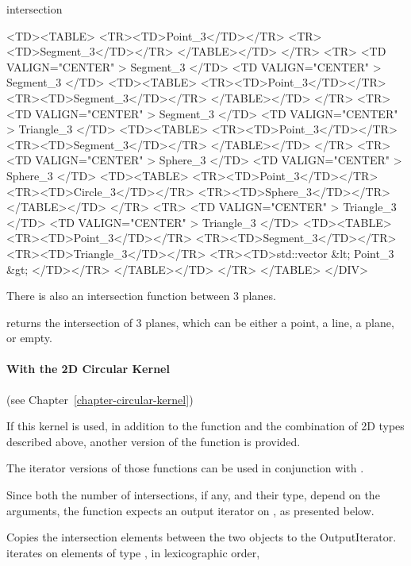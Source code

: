 \begin{ccRefFunction}{intersection}
\begin{ccHtmlOnly}
    <TD><TABLE>
	<TR><TD>Point_3</TD></TR>
	<TR><TD>Segment_3</TD></TR>
        </TABLE></TD>
</TR>
<TR>
    <TD VALIGN="CENTER" > Segment_3 </TD>
    <TD VALIGN="CENTER" > Segment_3 </TD>
    <TD><TABLE>
	<TR><TD>Point_3</TD></TR>
	<TR><TD>Segment_3</TD></TR>
        </TABLE></TD>
</TR>
<TR>
    <TD VALIGN="CENTER" > Segment_3 </TD>
    <TD VALIGN="CENTER" > Triangle_3 </TD>
    <TD><TABLE>
	<TR><TD>Point_3</TD></TR>
	<TR><TD>Segment_3</TD></TR>
        </TABLE></TD>
</TR>
<TR>
    <TD VALIGN="CENTER" > Sphere_3 </TD>
    <TD VALIGN="CENTER" > Sphere_3 </TD>
    <TD><TABLE>
	<TR><TD>Point_3</TD></TR>
	<TR><TD>Circle_3</TD></TR>
	<TR><TD>Sphere_3</TD></TR>
        </TABLE></TD>
</TR>
<TR>
    <TD VALIGN="CENTER" > Triangle_3 </TD>
    <TD VALIGN="CENTER" > Triangle_3 </TD>
    <TD><TABLE>
	<TR><TD>Point_3</TD></TR>
	<TR><TD>Segment_3</TD></TR>
	<TR><TD>Triangle_3</TD></TR>
	<TR><TD>std::vector &lt; Point_3  &gt; </TD></TR>
        </TABLE></TD>
</TR>
</TABLE>
</DIV>
\end{ccHtmlOnly}

There is also an intersection function between 3 planes.

{returns the intersection of 3 planes, which can be either a point, a line,
a plane, or empty.}

\paragraph{With the 2D Circular Kernel} (see Chapter~\ref{chapter-circular-kernel}) 


If this kernel is used, in addition to the function and the
combination of 2D types described above, another version of the function
is provided.

The iterator versions of those functions can be used in conjunction
with .

Since both the number of intersections, if any, and their type,
depend on the arguments, the function expects an output
iterator on , as presented below. 

{Copies the intersection elements between the
two objects to the OutputIterator.  iterates on
elements of type , in lexicographic order,}


\end{ccRefFunction}
